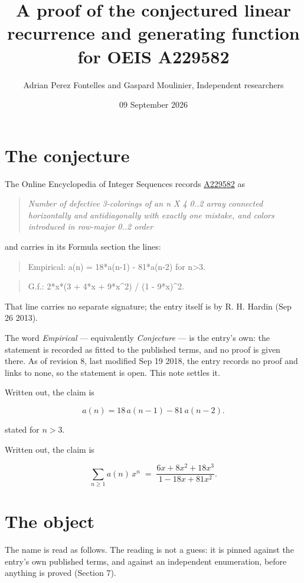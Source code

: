\documentclass[11pt]{article}
\title{A proof of the conjectured linear recurrence and generating function for OEIS A229582}
\author{Adrian Perez Fontelles and Gaspard Moulinier, Independent researchers}
\date{09 September 2026}
\theoremstyle{definition}
\begin{document}
\maketitle
\section{The conjecture}

The Online Encyclopedia of Integer Sequences records \href{https://oeis.org/A229582}{A229582} as

\begin{quote}\itshape Number of defective 3-colorings of an n X 4 0..2 array connected horizontally and antidiagonally with exactly one mistake, and colors introduced in row-major 0..2 order\end{quote}

and carries in its Formula section the lines:

\begin{quote}\ttfamily Empirical: a(n) = 18*a(n-1) - 81*a(n-2) for n>3.\end{quote}

\begin{quote}\ttfamily G.f.: 2*x*(3 + 4*x + 9*x\textasciicircum{}2) / (1 - 9*x)\textasciicircum{}2.\end{quote}

That line carries no separate signature; the entry itself is by R. H. Hardin (Sep 26 2013).

The word {\itshape Empirical} --- equivalently {\itshape Conjecture} --- is the entry's own: the statement is recorded as fitted to the published terms, and no proof is given there. As of revision 8, last modified Sep 19 2018, the entry records no proof and links to none, so the statement is open. This note settles it.

Written out, the claim is

\[a(n) = 18\,a(n-1) - 81\,a(n-2).\]

stated for $n > 3$.

Written out, the claim is

\[\sum_{n \ge 1} a(n)\,x^n \;=\; \frac{6x + 8x^{2} + 18x^{3}}{1 - 18x + 81x^{2}}.\]

\section{The object}

The name is read as follows. The reading is not a guess: it is pinned against the entry's own published terms, and against an independent enumeration, before anything is proved (Section 7).
\end{document}
